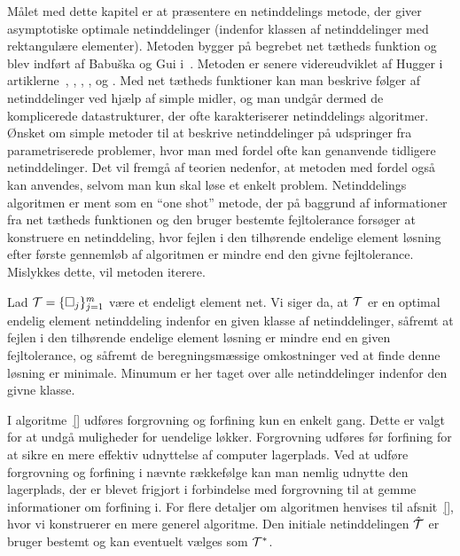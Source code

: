 \newcommand{\dom}{\Omega}
\newcommand{\mathcal}{\cal}
\newcommand{\eqref}[1]{(\ref{#1})}
\newcommand{\I}{{\mathcal I}}
\newcommand{\T}{{\mathcal T}}
\newcommand{\D}{{\mathcal D}}

Målet med dette kapitel er at præsentere en netinddelings 
metode, der giver asymptotiske optimale netinddelinger 
(indenfor klassen af netinddelinger med rektangulære 
elementer). Metoden bygger på begrebet net tætheds funktion 
og blev indført af Babu\v{s}ka og Gui i~\cite{}. Metoden er 
senere videreudviklet af Hugger i artiklerne~\cite{}, 
\cite{}, \cite{}, \cite{}, \cite{} og \cite{}. Med net 
tætheds funktioner kan man beskrive følger af netinddelinger
ved hjælp af simple midler, og man undgår dermed de 
komplicerede datastrukturer, der ofte karakteriserer 
netinddelings algoritmer. Ønsket om simple metoder til at 
beskrive netinddelinger på udspringer fra parametriserede
problemer, hvor man med fordel ofte kan genanvende tidligere
netinddelinger. Det vil fremgå af teorien nedenfor, at 
metoden med fordel også kan anvendes, selvom man kun skal 
løse et enkelt problem. Netinddelings algoritmen er ment som 
en ``one shot'' metode, der på baggrund af informationer fra 
net tætheds funktionen og den bruger bestemte fejltolerance 
forsøger at konstruere en netinddeling, hvor fejlen i den
tilhørende endelige element løsning efter første gennemløb af 
algoritmen er mindre end den givne fejltolerance. Mislykkes 
dette, vil metoden iterere.
 
Lad $\T=\{\Box_j\}_{j=1}^m$ være et endeligt element net. Vi
siger da, at $\T$ er en optimal endelig element netinddeling
indenfor en given klasse af netinddelinger, såfremt at fejlen
i den tilhørende endelige element løsning er mindre end en 
given fejltolerance, og såfremt de beregningsmæssige 
omkostninger ved at finde denne løsning er minimale. Minumum er 
her taget over alle netinddelinger indenfor den givne klasse.

I algoritme~\ref{} udføres forgrovning og forfining kun en 
enkelt gang. Dette er valgt for at undgå muligheder for 
uendelige løkker. Forgrovning udføres før forfining for at sikre
en mere effektiv udnyttelse af computer lagerplads. Ved at udføre
forgrovning og forfining i nævnte rækkefølge kan man nemlig 
udnytte den lagerplads, der er blevet frigjort i forbindelse med
forgrovning til at gemme informationer om forfining i. For flere 
detaljer om algoritmen henvises til afsnit~\ref{}, hvor vi 
konstruerer en mere generel algoritme. Den initiale netinddelingen
$\hat{\T}$ er bruger bestemt og kan eventuelt vælges som $\T^{\ast}$.

